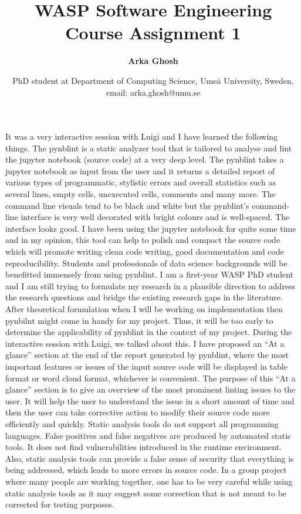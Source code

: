 \documentclass{article}
\title{\textbf{WASP Software Engineering Course Assignment 1}}
\author{\textbf{Arka Ghosh}}
\date{PhD student at Department of Computing Science, Umeå University, Sweden, email: arka.ghosh@umu.se}
\begin{document}
\maketitle
\large 
It was a very interactive session with Luigi and I have learned the following things. The pynblint is a static analyzer tool that is tailored to analyse and lint the jupyter notebook (source code) at a very deep level. The pynblint takes a jupyter notebook as input from the user and it returns a detailed report of various types of programmatic, stylistic errors and overall statistics such as several lines, empty cells, unexecuted cells, comments and many more. The command line visuals tend to be black and white but the pynblint’s command-line interface is very well decorated with bright colours and is well-spaced. The interface looks good. I have been using the jupyter notebook for quite some time and in my opinion, this tool can help to polish and compact the source code which will promote writing clean code writing, good documentation and code reproducibility. Students and professionals of data science backgrounds will be benefitted immensely from using pynblint.  
I am a first-year WASP PhD student and I am still trying to formulate my research in a plausible direction to address the research questions and bridge the existing research gaps in the literature. After theoretical formulation when I will be working on implementation then pynbilnt might come in handy for my project. Thus, it will be too early to determine the applicability of pynblint in the context of my project.
During the interactive session with Luigi, we talked about this. I have proposed an “At a glance” section at the end of the report generated by pynblint, where the most important features or issues of the input source code will be displayed in table format or word cloud format, whichever is convenient. The purpose of this “At a glance” section is to give an overview of the most prominent linting issues to the user. It will help the user to understand the issue in a short amount of time and then the user can take corrective action to modify their source code more efficiently and quickly.  
Static analysis tools do not support all programming languages. False positives and false negatives are produced by automated static tools. It does not find vulnerabilities introduced in the runtime environment. Also, static analysis tools can provide a false sense of security that everything is being addressed, which leads to more errors in source code. In a group project where many people are working together, one has to be very careful while using static analysis tools as it may suggest some correction that is not meant to be corrected for testing purposes. 
\end{document}
